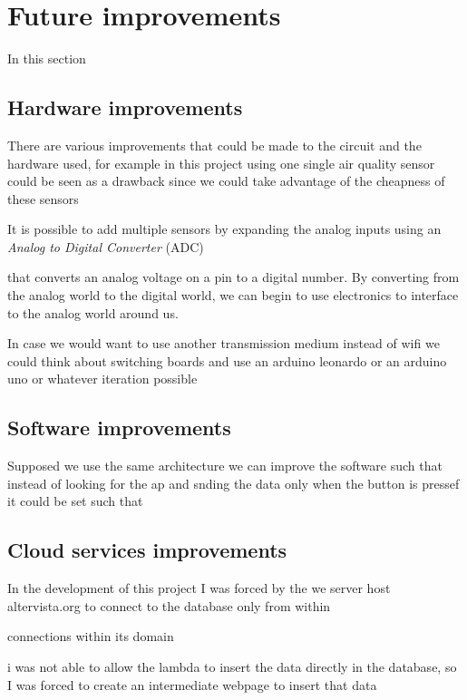 \documentclass[conference]{IEEEtran}
\begin{document}
\section{Future improvements}

	In this section 
	
	\subsection{Hardware improvements}
	
		There are various improvements that could be made to the circuit and the hardware used, for example in this project using one single air quality sensor could be seen as a drawback since we could take advantage of the cheapness of these sensors
		
		It is possible to add multiple sensors by expanding the analog inputs using an \textit{Analog to Digital Converter} (ADC)
		
		that converts an analog voltage on a pin to a digital number. By converting from the analog world to the digital world, we can begin to use electronics to interface to the analog world around us.\cite{adc}
	
		In case we would want to use another transmission medium instead of wifi we could think about switching boards and use an arduino leonardo or an arduino uno or whatever iteration possible
	
	\subsection{Software improvements}
	
		Supposed we use the same architecture we can improve the software such that instead of looking for the ap and snding the data only when the button is pressef it could be set such that 
		
	\subsection{Cloud services improvements}
	
		In the development of this project I was forced by the we server host altervista.org to connect to the database only from within
		
		connections within its domain
		
		i was not able to allow the lambda to insert the data directly in the database, so I was forced to create an intermediate webpage to insert that data
		
\end{document}
